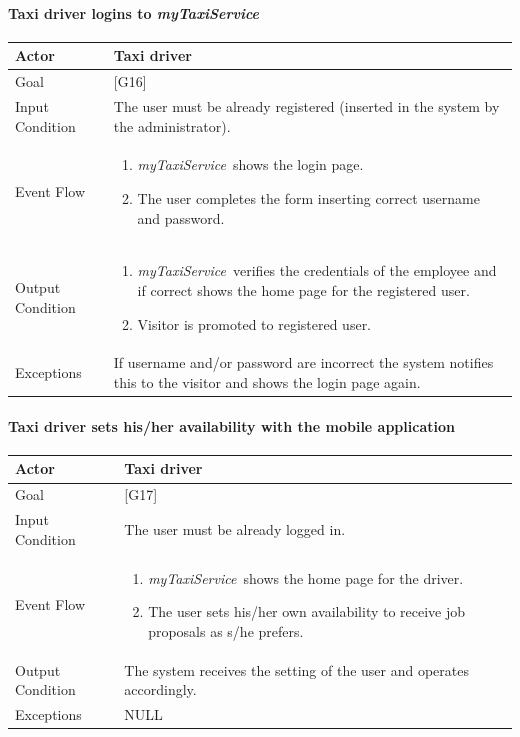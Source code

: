 \documentclass[a4paper,11pt]{report} %
\newcommand{\mts}{\mbox{\normalfont\itshape myTaxiService\ }}
\begin{document}
	\pagebreak
	
	\paragraph{Taxi driver logins to \mts}
	\begin{center}
		\begin{tabular}{| l | p{9cm} |}\hline
			Actor & Taxi driver\\\hline
			Goal & {[}G16{]} \\\hline
			Input Condition & The user must be already registered (inserted in the system by the administrator).\\\hline
			Event Flow & \begin{enumerate}
				\item \mts shows the login page.
				\item The user completes the form inserting correct username and password.
			\end{enumerate}\\\hline
			Output Condition & \begin{enumerate}
				\item \mts verifies the credentials of the employee and if correct shows the home page for the registered user.
				\item Visitor is promoted to registered user.
			\end{enumerate}\\\hline
			Exceptions & If username and/or password are incorrect the system notifies this to the visitor and shows the login page again.\\\hline
		\end{tabular}
	\end{center}
	
	\pagebreak
	
	\paragraph{Taxi driver sets his/her availability with the mobile application}
	\begin{center}
		\begin{tabular}{| l | p{9cm} |}\hline
			Actor & Taxi driver\\\hline
			Goal & {[}G17{]} \\\hline
			Input Condition & The user must be already logged in.\\\hline
			Event Flow & \begin{enumerate}
				\item \mts shows the home page for the driver.
				\item The user sets his/her own availability to receive job proposals as s/he prefers.
			\end{enumerate}\\\hline
			Output Condition & The system receives the setting of the user and operates accordingly.\\\hline
			Exceptions & NULL\\\hline
		\end{tabular}
	\end{center}
	
\end{document}

